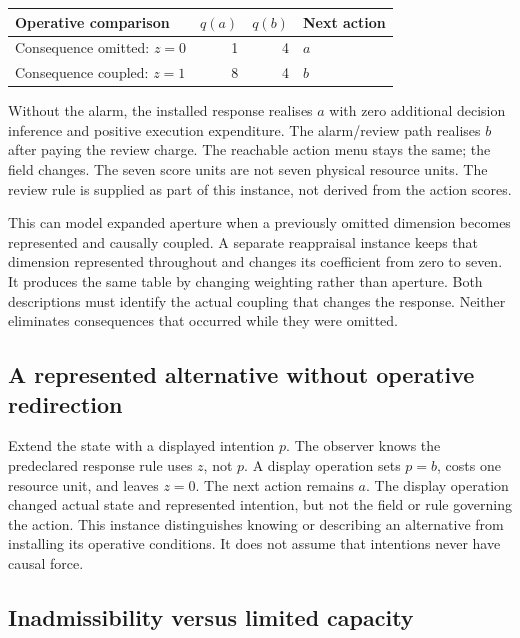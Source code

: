 \documentclass[11pt,a4paper]{article}
\theoremstyle{remark}
\begin{document}
\begin{center}
\begin{tabular}{lrrl}
\toprule
Operative comparison & \(q(a)\) & \(q(b)\) & Next action\\
\midrule
Consequence omitted: \(z=0\) & 1 & 4 & \(a\)\\
Consequence coupled: \(z=1\) & 8 & 4 & \(b\)\\
\bottomrule
\end{tabular}
\end{center}

Without the alarm, the installed response realises \(a\) with zero additional
decision inference and positive execution expenditure. The alarm/review path
realises \(b\) after paying the review charge. The reachable action menu stays
the same; the field changes. The seven score units are not seven physical
resource units. The review rule is supplied as part of this instance, not
derived from the action scores.

This can model expanded aperture when a previously omitted dimension becomes
represented and causally coupled. A separate reappraisal instance keeps that
dimension represented throughout and changes its coefficient from zero to
seven. It produces the same table by changing weighting rather than aperture.
Both descriptions must identify the actual coupling that changes the response.
Neither eliminates consequences that occurred while they were omitted.

\subsection{A represented alternative without operative redirection}

Extend the state with a displayed intention \(p\). The observer knows the
predeclared response rule uses \(z\), not \(p\). A display operation sets
\(p=b\), costs one resource unit, and leaves \(z=0\). The next action remains
\(a\). The display operation changed actual state and represented intention,
but not the field or rule governing the action. This instance distinguishes
knowing or describing an alternative from installing its operative conditions.
It does not assume that intentions never have causal force.

\subsection{Inadmissibility versus limited capacity}
\end{document}
